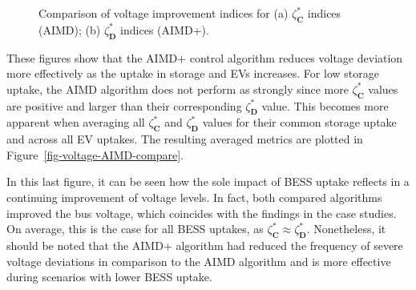 \begin{figure}\centering
 \vspace{-5pt}
\caption{Comparison of voltage improvement indices for (a) $\zeta_\textbf{C}^{*}$ indices (AIMD); (b) $\zeta_\textbf{D}^{*}$ indices (AIMD+).}
 \label{fig-voltage-comparison-large}
\end{figure}

These figures show that the AIMD+ control algorithm reduces voltage deviation more effectively as the uptake in storage and EVs increases. For low storage uptake, the AIMD algorithm does not perform as strongly since more $\zeta_\textbf{C}^{*}$ values are positive and larger than their corresponding $\zeta_\textbf{D}^{*}$ value. This becomes more apparent when averaging all $\zeta_\textbf{C}^{*}$ and $\zeta_\textbf{D}^{*}$ values for their common storage uptake and across all EV uptakes. The resulting averaged metrics are plotted in Figure~\ref{fig-voltage-AIMD-compare}.

In this last figure, it can be seen how the sole impact of BESS uptake reflects in a continuing improvement of voltage levels. In fact, both compared algorithms improved the bus voltage, which coincides with the findings in the case studies. On average, this is the case for all BESS uptakes, as $\zeta_\textbf{C}^{*} \approx \zeta_\textbf{D}^{*}$. Nonetheless, it should be noted that the AIMD+ algorithm had reduced the frequency of severe voltage deviations in comparison to the AIMD algorithm and is more effective during scenarios with lower BESS uptake.

